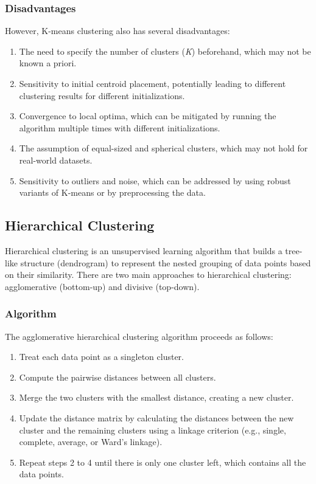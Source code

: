 \documentclass[12pt]{article}
\begin{document}
\subsubsection{Disadvantages}
However, K-means clustering also has several disadvantages:
\begin{enumerate}
\item The need to specify the number of clusters (\textit{K}) beforehand, which may not be known a priori.
\item Sensitivity to initial centroid placement, potentially leading to different clustering results for different initializations.
\item Convergence to local optima, which can be mitigated by running the algorithm multiple times with different initializations.
\item The assumption of equal-sized and spherical clusters, which may not hold for real-world datasets.
\item Sensitivity to outliers and noise, which can be addressed by using robust variants of K-means or by preprocessing the data.
\end{enumerate}


\subsection{Hierarchical Clustering}
Hierarchical clustering is an unsupervised learning algorithm that builds a tree-like structure (dendrogram) to represent the nested grouping of data points based on their similarity. There are two main approaches to hierarchical clustering: agglomerative (bottom-up) and divisive (top-down).

\subsubsection{Algorithm}
The agglomerative hierarchical clustering algorithm proceeds as follows:
\begin{enumerate}
\item Treat each data point as a singleton cluster.
\item Compute the pairwise distances between all clusters.
\item Merge the two clusters with the smallest distance, creating a new cluster.
\item Update the distance matrix by calculating the distances between the new cluster and the remaining clusters using a linkage criterion (e.g., single, complete, average, or Ward's linkage).
\item Repeat steps 2 to 4 until there is only one cluster left, which contains all the data points.
\end{enumerate}
\end{document}
